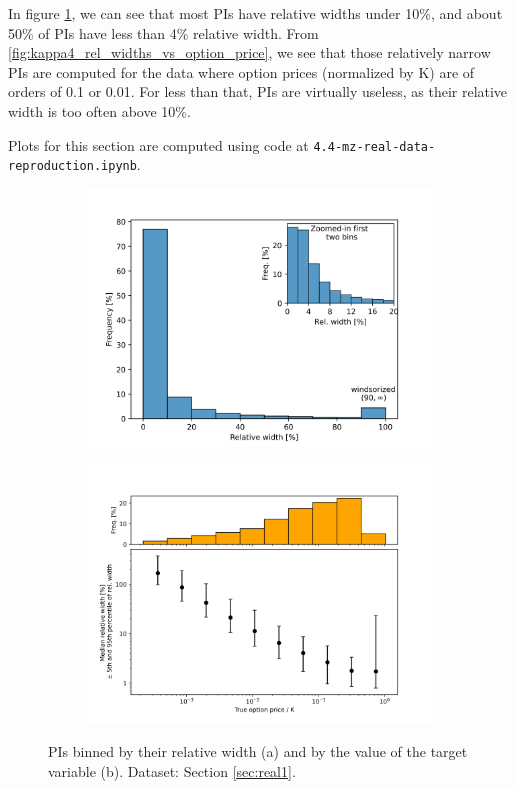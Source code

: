 \documentclass{article}
\theoremstyle{definition}
\begin{document}
In figure \ref{fig:real1_relative_widths}, we can see that most PIs have relative widths under 10\%, and about 50\% of PIs have less than 4\% relative width. From \ref{fig:kappa4_rel_widths_vs_option_price}, we see that those relatively narrow PIs are computed for the data where option prices (normalized by K) are of orders of 0.1 or 0.01. For less than that, PIs are virtually useless, as their relative width is too often above 10\%.   

Plots for this section are computed using code at \texttt{4.4-mz-real-data-reproduction.ipynb}.

\begin{figure}
\begin{subfigure}{0.5\textwidth}
\includegraphics[width=1\linewidth]{reports/figures/real_data_replication/real1_relative_widths.png}
\caption{}
\label{fig:real1_relative_widths}
\end{subfigure}
\begin{subfigure}{0.5\textwidth}
\includegraphics[width=1\linewidth]{reports/figures/real_data_replication/real1_rel_widths_to_opt_price.png} 
\caption{}
\label{fig:real1_rel_widths_to_opt_price}
\end{subfigure}
\caption{PIs binned by their relative width (a) and by the value of the target variable (b). Dataset: Section \ref{sec:real1}.}
\label{fig:real1_widths}
\end{figure}
\end{document}
